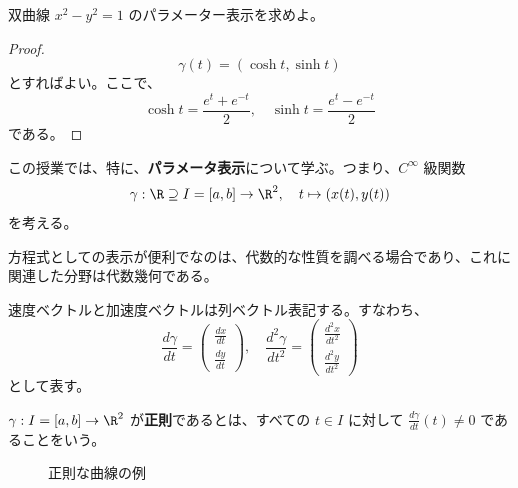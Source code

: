 \documentclass[article,paper=a4paper]{jlreq}
\begin{document}
\begin{prob}
    双曲線 $x^2-y^2=1$ のパラメーター表示を求めよ。
\end{prob}

\begin{proof}
    $$\gamma(t)=(\cosh t, \sinh t)$$
    とすればよい。ここで、
    \[
    \cosh t = \frac{e^t + e^{-t}}{2}, \quad \sinh t = \frac{e^t - e^{-t}}{2}
    \]
    である。
\end{proof}

この授業では、特に、\textbf{パラメータ表示}について学ぶ。つまり、$C^{\infty}$ 級関数
\[\gamma : \R \supseteq I=[a,b] \to \R^2, \quad t \mapsto (x(t), y(t))\]
を考える。

方程式としての表示が便利でなのは、代数的な性質を調べる場合であり、これに関連した分野は代数幾何である。

速度ベクトルと加速度ベクトルは列ベクトル表記する。すなわち、
\[
\frac{d\gamma}{dt} = \begin{pmatrix} \frac{dx}{dt} \\ \frac{dy}{dt} \end{pmatrix}, \quad \frac{d^2\gamma}{dt^2} = \begin{pmatrix} \frac{d^2x}{dt^2} \\ \frac{d^2y}{dt^2} \end{pmatrix}
\]
として表す。

\begin{dfn}
    \quad $\gamma : I = [a,b] \to \R^2$ が\textbf{正則}であるとは、すべての $t \in I$ に対して $\frac{d\gamma}{dt}(t) \neq 0$ であることをいう。
\end{dfn}

\begin{figure}[htbp]
\centering
{}
\caption{正則な曲線の例}
\end{figure}
\end{document}
